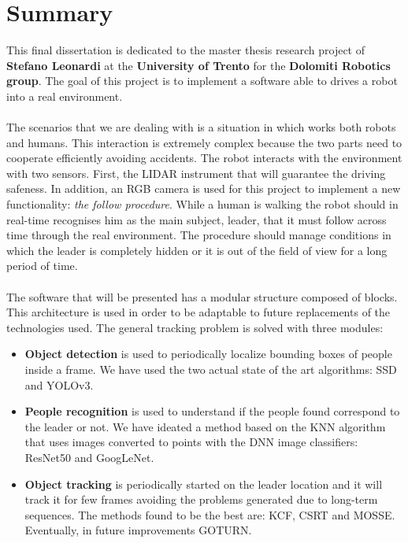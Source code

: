 \chapter*{Summary}\label{cha:summary}
This final dissertation is dedicated to the master thesis research project\cite{projectSourceCode} of \textbf{Stefano Leonardi} at the \textbf{University of Trento} for the \textbf{Dolomiti Robotics group}\cite{dolomitiRobotics}. The goal of this project is to implement a software able to drives a robot into a real environment.\\
\\
The scenarios that we are dealing with is a situation in which works both robots and humans. This interaction is extremely complex because the two parts need to cooperate efficiently avoiding accidents. The robot interacts with the environment with two sensors. First, the LIDAR instrument that will guarantee the driving safeness. In addition, an RGB camera is used for this project to implement a new functionality: \textit{the follow procedure}. While a human is walking the robot should in real-time recognises him as the main subject, leader, that it must follow across time through the real environment. The procedure should manage conditions in which the leader is completely hidden or it is out of the field of view for a long period of time.\\
\\
The software that will be presented has a modular structure composed of blocks. This architecture is used in order to be adaptable to future replacements of the technologies used. The general tracking problem is solved with three modules:
\begin{itemize}
	\item \textbf{Object detection} is used to periodically localize bounding boxes of people inside a frame. We have used the two actual state of the art algorithms: SSD\cite{ssd} and YOLOv3\cite{yoloV3}.
	\item \textbf{People recognition} is used to understand if the people found correspond to the leader or not. We have ideated a method based on the KNN algorithm that uses images converted to points with the DNN image classifiers: ResNet50\cite{resNet_paper} and GoogLeNet\cite{googLeNet_paper}.
	\item \textbf{Object tracking} is periodically started on the leader location and it will track it for few frames avoiding the problems generated due to long-term sequences. The methods found to be the best are: KCF\cite{kcf}, CSRT\cite{csrt} and MOSSE\cite{mosse}. Eventually, in future improvements GOTURN\cite{goturn}.
\end{itemize}
